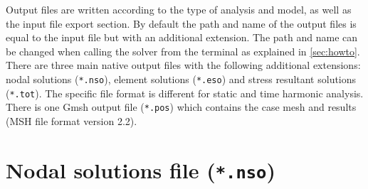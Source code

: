\documentclass[a4paper,fleqn]{book}
\begin{document}
Output files are written according to the type of analysis and model, as well as the input file export section. By default the path and name of the output files is equal to the input file but with an additional extension. The path and name can be changed when calling the solver from the terminal as explained in \ref{sec:howto}. There are three main native output files with the following additional extensions: nodal solutions (\texttt{*.nso}), element solutions (\texttt{*.eso}) and stress resultant solutions (\texttt{*.tot}). The specific file format is different for static and time harmonic analysis. There is one Gmsh output file (\texttt{*.pos}) which contains the case mesh and results (MSH file format version 2.2).

\section{Nodal solutions file (\texttt{*.nso})}

\end{document}
